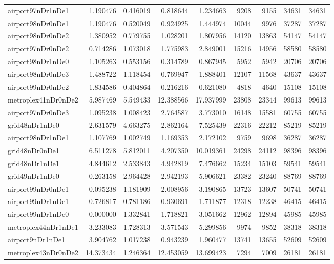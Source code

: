 \begin{longtable}{|l|r|r|r|r|r|r|r|r|}
airport97nDr1nDe1 & 1.190476 & 0.416019 & 0.818644 & 1.234663 & 9208 & 9155 & 34631 & 34631 \\
airport98nDr0nDe1 & 1.190476 & 0.520049 & 0.924925 & 1.444974 & 10044 & 9976 & 37287 & 37287 \\
airport98nDr0nDe2 & 1.380952 & 0.779755 & 1.028201 & 1.807956 & 14120 & 13863 & 54147 & 54147 \\
airport97nDr0nDe2 & 0.714286 & 1.073018 & 1.775983 & 2.849001 & 15216 & 14956 & 58580 & 58580 \\
airport98nDr1nDe0 & 1.105263 & 0.553156 & 0.314789 & 0.867945 & 5952 & 5942 & 20706 & 20706 \\
airport98nDr0nDe3 & 1.488722 & 1.118454 & 0.769947 & 1.888401 & 12107 & 11568 & 43637 & 43637 \\
airport99nDr0nDe2 & 1.834586 & 0.404864 & 0.216216 & 0.621080 & 4818 & 4640 & 15108 & 15108 \\
metroplex41nDr0nDe2 & 5.987469 & 5.549433 & 12.388566 & 17.937999 & 23808 & 23344 & 99613 & 99613 \\
airport97nDr0nDe3 & 1.095238 & 1.008423 & 2.764587 & 3.773010 & 16148 & 15581 & 60755 & 60755 \\
grid48nDr1nDe0 & 2.631579 & 4.663275 & 2.862164 & 7.525439 & 22316 & 22212 & 85219 & 85219 \\
airport98nDr1nDe1 & 1.107769 & 1.002749 & 1.169353 & 2.172102 & 9759 & 9698 & 36287 & 36287 \\
grid48nDr0nDe1 & 6.511278 & 5.812011 & 4.207350 & 10.019361 & 24298 & 24112 & 98396 & 98396 \\
grid48nDr1nDe1 & 4.844612 & 2.533843 & 4.942819 & 7.476662 & 15234 & 15103 & 59541 & 59541 \\
grid49nDr1nDe0 & 0.263158 & 2.964428 & 2.942193 & 5.906621 & 23382 & 23240 & 88769 & 88769 \\
airport99nDr0nDe1 & 0.095238 & 1.181909 & 2.008956 & 3.190865 & 13723 & 13607 & 50741 & 50741 \\
airport99nDr1nDe1 & 0.726817 & 0.781186 & 0.930691 & 1.711877 & 12318 & 12238 & 46415 & 46415 \\
airport99nDr1nDe0 & 0.000000 & 1.332841 & 1.718821 & 3.051662 & 12962 & 12894 & 45985 & 45985 \\
metroplex44nDr1nDe1 & 3.233083 & 1.728313 & 3.571543 & 5.299856 & 9974 & 9852 & 38318 & 38318 \\
airport9nDr1nDe1 & 3.904762 & 1.017238 & 0.943239 & 1.960477 & 13741 & 13655 & 52609 & 52609 \\
metroplex43nDr0nDe2 & 14.373434 & 1.246364 & 12.453059 & 13.699423 & 7294 & 7009 & 26181 & 26181 \\

\end{longtable}
